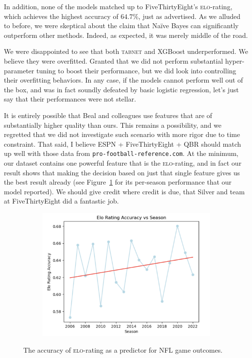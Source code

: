 \documentclass[10pt]{article}
\begin{document}
In addition, none of the models matched up to FiveThirtyEight's \textsc{elo}-rating, which achieves
the highest accuracy of $64.7\%$, just as advertised. As we alluded to before, we were
skeptical about the claim that Na\"ive Bayes can significantly outperform other methods.
Indeed, as expected, it was merely middle of the road.

We were disappointed to see that both \textsc{tabnet} and XGBoost underperformed. We believe they
were overfitted. Granted that we did not perform substantial hyper-parameter tuning to
boost their performance, but we did look into controlling their overfitting behaviors. In
any case, if the models cannot perform well out of the box, and was in fact soundly
defeated by basic logistic regression, let's just say that their performances were not stellar.

It is entirely possible that Beal and colleagues use features that are of substantially
higher quality than ours. This remains a possibility, and we regretted that we did not
investigate such scenario with more rigor due to time constraint. That said, I believe 
ESPN + FiveThirtyEight + QBR should match up well with those data from
\texttt{pro-football-reference.com}. At the minimum, our dataset contains one powerful
feature that is the \textsc{elo}-rating, and in fact our result shows that making the decision based
on just that single feature gives us the best result already (see Figure~\ref{fig:elo} for
its per-season performance that our model reported).
We should give credit where credit is due, that Silver and team at FiveThirtyEight did a fantastic
job.

\begin{figure}[htbp]
\centering
\begin{subfigure}{0.61\columnwidth}
\includegraphics[width=\columnwidth]{elo.png}
\end{subfigure}
\caption{The accuracy of \textsc{elo}-rating as a predictor for NFL game outcomes.}
\label{fig:elo}
\end{figure}
\end{document}
